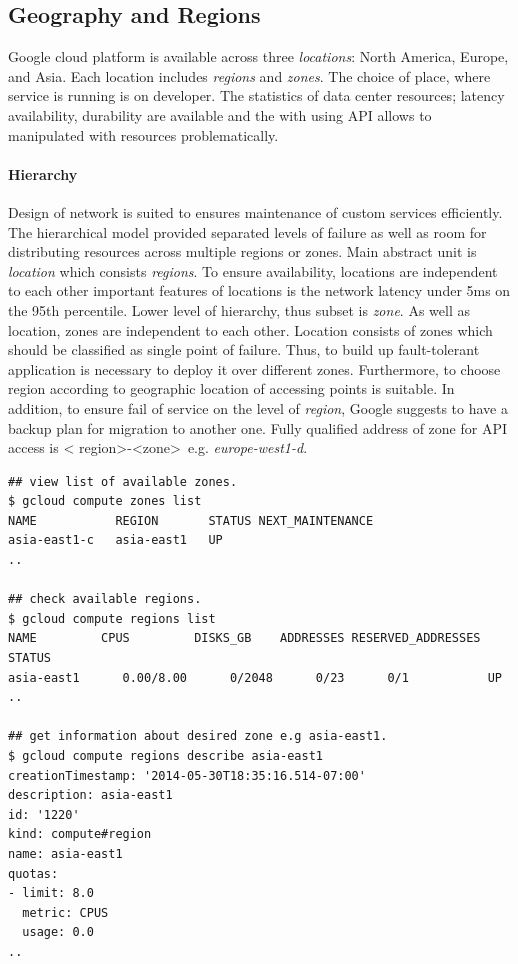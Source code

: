 \documentclass[a4paper,12pt,oneside]{report}
\begin{document}
		\subsection{Geography and Regions}
Google cloud platform is available across three \textit{locations}: North America, Europe, and Asia. Each location includes 
\textit{regions} and \textit{zones}. The choice of place, where service is running is on developer. The statistics of data 
center resources; latency availability, durability are available and the with using API allows to manipulated with resources problematically. 

\paragraph*{Hierarchy}
Design of network is suited to ensures maintenance  of custom services efficiently. The hierarchical model provided separated
 levels of failure as well as room for distributing resources across multiple regions or zones. Main abstract unit is \textit{location} 
 which consists \textit{regions}. To ensure availability, locations are independent to each other important features of locations is the 
 network latency under 5ms on the 95th percentile. Lower level of hierarchy, thus subset is \textit{zone}. As well as location, 
 zones are independent to each other. Location consists of zones which should be classified as single point of failure. Thus, 
 to build up fault-tolerant application is necessary to deploy it over different zones. Furthermore, to choose region according 
 to geographic location of accessing points is suitable. In addition, to ensure fail of service on the level of \textit{region}, 
 Google suggests to have a backup plan for migration to another one. Fully qualified address of zone   for API access is \textless 
 region\textgreater-\textless zone\textgreater \ e.g. \textit{europe-west1-d}. 


\begin{footnotesize}
\begin{lstlisting}[style=mybash]
## view list of available zones.
$ gcloud compute zones list
NAME           REGION       STATUS NEXT_MAINTENANCE 
asia-east1-c   asia-east1   UP
..

## check available regions.
$ gcloud compute regions list
NAME         CPUS         DISKS_GB    ADDRESSES RESERVED_ADDRESSES STATUS 
asia-east1      0.00/8.00      0/2048      0/23      0/1           UP
..

## get information about desired zone e.g asia-east1.
$ gcloud compute regions describe asia-east1
creationTimestamp: '2014-05-30T18:35:16.514-07:00'
description: asia-east1
id: '1220'
kind: compute#region
name: asia-east1
quotas:
- limit: 8.0
  metric: CPUS
  usage: 0.0
..
\end{lstlisting}\end{footnotesize}
 
\end{document}
